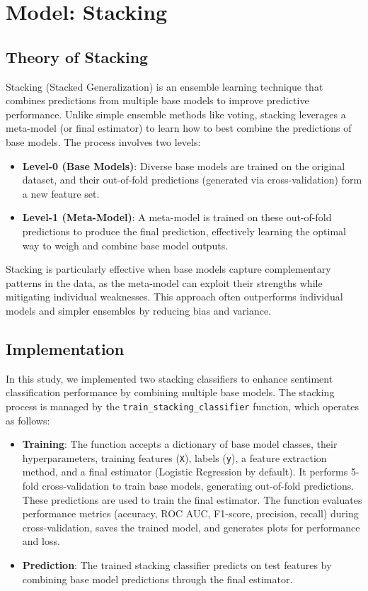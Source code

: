\section{Model: Stacking}

\subsection{Theory of Stacking}
Stacking (Stacked Generalization) is an ensemble learning technique that combines predictions from multiple base models to improve predictive performance. Unlike simple ensemble methods like voting, stacking leverages a meta-model (or final estimator) to learn how to best combine the predictions of base models. The process involves two levels:
\begin{itemize}
    \item \textbf{Level-0 (Base Models)}: Diverse base models are trained on the original dataset, and their out-of-fold predictions (generated via cross-validation) form a new feature set.
    \item \textbf{Level-1 (Meta-Model)}: A meta-model is trained on these out-of-fold predictions to produce the final prediction, effectively learning the optimal way to weigh and combine base model outputs.
\end{itemize}
Stacking is particularly effective when base models capture complementary patterns in the data, as the meta-model can exploit their strengths while mitigating individual weaknesses. This approach often outperforms individual models and simpler ensembles by reducing bias and variance.

\subsection{Implementation}
In this study, we implemented two stacking classifiers to enhance sentiment classification performance by combining multiple base models. The stacking process is managed by the \texttt{train\_stacking\_classifier} function, which operates as follows:

\begin{itemize}
    \item \textbf{Training}: The function accepts a dictionary of base model classes, their hyperparameters, training features (\texttt{X}), labels (\texttt{y}), a feature extraction method, and a final estimator (Logistic Regression by default). It performs 5-fold cross-validation to train base models, generating out-of-fold predictions. These predictions are used to train the final estimator. The function evaluates performance metrics (accuracy, ROC AUC, F1-score, precision, recall) during cross-validation, saves the trained model, and generates plots for performance and loss.
    \item \textbf{Prediction}: The trained stacking classifier predicts on test features by combining base model predictions through the final estimator.
\end{itemize}

